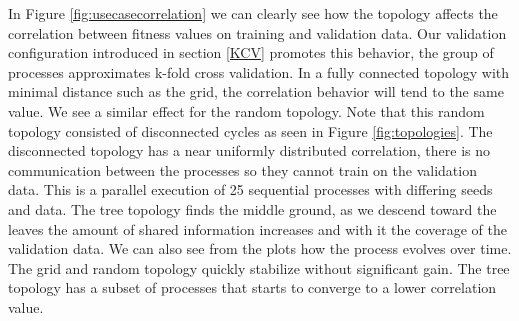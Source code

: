 In Figure \ref{fig:usecasecorrelation} we can clearly see how the topology affects the correlation between fitness values on training and validation data. Our validation configuration introduced in section \ref{KCV} promotes this behavior, the group of processes approximates k-fold cross validation. In a fully connected topology with minimal distance such as the grid, the correlation behavior will tend to the same value. We see a similar effect for the random topology. Note that this random topology consisted of disconnected cycles as seen in Figure \ref{fig:topologies}. The disconnected topology has  a near uniformly distributed correlation, there is no communication between the processes so they cannot train on the validation data. This is a parallel execution of 25 sequential processes with differing seeds and data. The tree topology finds the middle ground, as we descend toward the leaves the amount of shared information increases and with it the coverage of the validation data.
We can also see from the plots how the process evolves over time. The grid and random topology quickly stabilize without significant gain. The tree topology has a subset of processes that starts to converge to a lower correlation value. 

